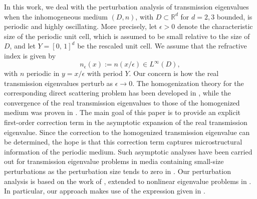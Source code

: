 \documentclass[10pt,a4paper]{amsart}
\begin{document}
\medskip
\noindent
In this work, we deal with the perturbation analysis of transmission eigenvalues when the inhomogeneous medium \((D,n)\), with \(D \subset \mathbb{R}^d\) for \(d=2,3\) bounded, is periodic and highly oscillating. More precisely, let \(\epsilon>0\) denote the characteristic size of the periodic unit cell, which is assumed to be small relative to the size of \(D\), and let \(Y=[0,\,1]^d\) be the rescaled unit cell. We assume that the refractive index is given by  
\[
n_\epsilon(x):=n(x/\epsilon) \in L^\infty(D),
\]  
with \(n\) periodic in \(y=x/\epsilon\) with period \(Y\).  
Our concern is how the real transmission eigenvalues perturb as \(\epsilon \to 0\). The homogenization theory for the corresponding direct scattering problem has been developed in \cite{CaMoPa,CaGuMoPa}, while the convergence of the real transmission eigenvalues to those of the homogenized medium was proven in \cite{CaHaHa}. The main goal of this paper is to provide an explicit first-order correction term in the asymptotic expansion of the real transmission eigenvalue. Since the correction to the homogenized transmission eigenvalue can be determined, the hope is that this correction term captures microstructural information of the periodic medium.   Such asymptotic analyses have been carried out for transmission eigenvalue problems in media containing small-size perturbations as the perturbation size tends to zero in \cite{CaHaMo,CaMoRo}. Our perturbation analysis is based on the work of \cite{Os}, extended to nonlinear eigenvalue problems in \cite{Mo,FuMo}. In particular, our approach makes use of the expression given in \cite{FuMo}.  
\end{document}
